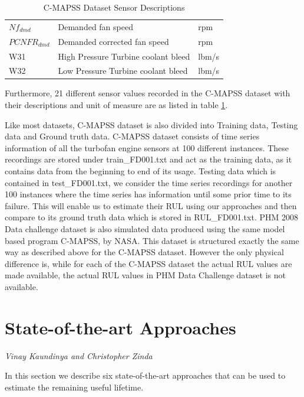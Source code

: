 \begin{table}[ht]
\begin{tabular}{ p{2.2cm}  p{9cm}  p{1.3cm} }
        $Nf_{dmd}$      & Demanded fan speed                                   & rpm           \\
        $PCNFR_{dmd}$   & Demanded corrected fan speed                         & rpm           \\
        W31             & High Pressure Turbine coolant bleed                  & lbm/s         \\
        W32             & Low Pressure Turbine coolant bleed                   & lbm/s         \\
        \hline
    \end{tabular}
    \caption{C-MAPSS Dataset Sensor Descriptions}
    \label{tab:rul_table2}
\end{table}

Furthermore, 21 different sensor values recorded in the C-MAPSS dataset with their descriptions and unit of measure are as listed in table \ref{tab:rul_table2}.

Like most datasets, C-MAPSS dataset is also divided into Training data, Testing data and Ground truth data. C-MAPSS dataset consists of time series information of all the turbofan engine sensors at 100 different instances. These recordings are stored under train\_FD001.txt and act as the training data, as it contains data from the beginning to end of its usage. Testing data which is contained in test\_FD001.txt, we consider the time series recordings for another 100 instances where the time series has information until some prior time to its failure. This will enable us to estimate their RUL using our approaches and then compare to its ground truth data which is stored in RUL\_FD001.txt.
PHM 2008 Data challenge dataset is also simulated data produced using the same model based program C-MAPSS, by NASA. This dataset is structured exactly the same way as described above for the C-MAPSS dataset. However the only physical difference is, while for each of the C-MAPSS dataset the actual RUL values are made available, the actual RUL values in PHM Data Challenge dataset is not available.

\section{State-of-the-art Approaches}
\vspace*{-3mm}\hfill{\normalsize\emph{Vinay Kaundinya and Christopher Zinda}}
\label{sec:rul_estimation:approaches}

In this section we describe six state-of-the-art approaches that can be used to estimate the remaining useful lifetime.

